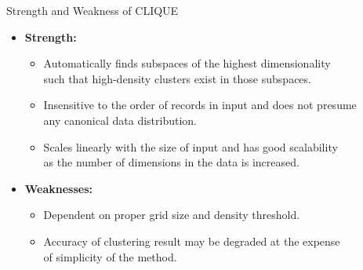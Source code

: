 \begin{frame}{Strength and Weakness of CLIQUE}
	\begin{itemize}
		\item \textbf{Strength:}
		\begin{itemize}
			\item Automatically finds subspaces of the highest dimensionality \\
			such that high-density clusters exist in those subspaces.
			\item Insensitive to the order of records in input and does not 
			presume \\
			any canonical data distribution.
			\item Scales linearly with the size of input and has good 
			scalability \\
			as the number of dimensions in the data is increased.
		\end{itemize}
		\item \textbf{Weaknesses:}
		\begin{itemize}
			\item Dependent on proper grid size and density threshold.
			\item Accuracy of clustering result may be degraded at the expense 
			\\
			of simplicity of the method.
		\end{itemize}
	\end{itemize}
\end{frame}
